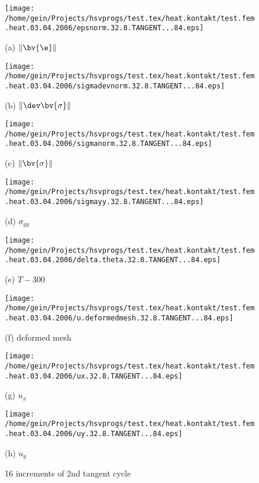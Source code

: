 \begin{figure}[h!]
\begin{minipage}[c]{7cm} 
\texttt{[image: /home/gein/Projects/hsvprogs/test.tex/heat.kontakt/test.fem.heat.03.04.2006/epsnorm.32.8.TANGENT...84.eps]}

{(a) $\|\bv{\e}\|$} 
\end{minipage}
\begin{minipage}[c]{7cm}
\texttt{[image: /home/gein/Projects/hsvprogs/test.tex/heat.kontakt/test.fem.heat.03.04.2006/sigmadevnorm.32.8.TANGENT...84.eps]}

{(b) $\|\dev\bv{\sigma}\|$}
\end{minipage}

\begin{minipage}[c]{7cm}
\texttt{[image: /home/gein/Projects/hsvprogs/test.tex/heat.kontakt/test.fem.heat.03.04.2006/sigmanorm.32.8.TANGENT...84.eps]}

{(c) $\|\bv{\sigma}\|$}
\end{minipage}
\begin{minipage}[c]{7cm}
\texttt{[image: /home/gein/Projects/hsvprogs/test.tex/heat.kontakt/test.fem.heat.03.04.2006/sigmayy.32.8.TANGENT...84.eps]}

{(d) $\sigma_{yy}$}
\end{minipage}

\begin{minipage}[c]{7cm}
\texttt{[image: /home/gein/Projects/hsvprogs/test.tex/heat.kontakt/test.fem.heat.03.04.2006/delta.theta.32.8.TANGENT...84.eps]}

{(e) $T-300$}
\end{minipage}
\begin{minipage}[c]{7cm}
\texttt{[image: /home/gein/Projects/hsvprogs/test.tex/heat.kontakt/test.fem.heat.03.04.2006/u.deformedmesh.32.8.TANGENT...84.eps]}

{(f) deformed mesh}
\end{minipage}

\begin{minipage}[c]{7cm}
\texttt{[image: /home/gein/Projects/hsvprogs/test.tex/heat.kontakt/test.fem.heat.03.04.2006/ux.32.8.TANGENT...84.eps]}

{(g) $u_x$}
\end{minipage}
\begin{minipage}[c]{7cm}
\texttt{[image: /home/gein/Projects/hsvprogs/test.tex/heat.kontakt/test.fem.heat.03.04.2006/uy.32.8.TANGENT...84.eps]}

{(h) $u_y$}
\end{minipage}
\caption{16 increments of 2nd tangent cycle}\label{fig:Fig1}
\end{figure}

